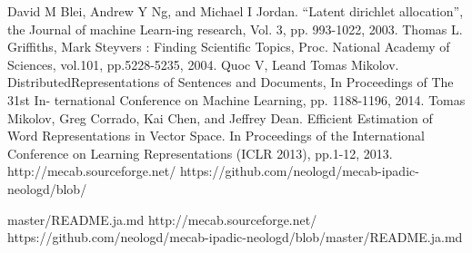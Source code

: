 \documentclass[a4paper,11pt,oneside,openany]{jsbook}
\begin{document}
\begin{thebibliography}{99}
	David M Blei, Andrew Y Ng, and Michael I Jordan. “Latent dirichlet allocation”, the Journal of machine Learn-ing research, Vol. 3, pp. 993-1022, 2003.
	Thomas L. Griffiths, Mark Steyvers : Finding Scientific Topics, Proc. National Academy of Sciences, vol.101, pp.5228-5235, 2004.	
	Quoc V, Leand Tomas Mikolov. DistributedRepresentations of Sentences and Documents, In Proceedings of The 31st In- ternational Conference on Machine Learning, pp. 1188-1196, 2014.	
	Tomas Mikolov, Greg Corrado, Kai Chen, and Jeffrey Dean. Efficient Estimation of Word Representations in Vector Space. In Proceedings of the International Conference on Learning Representations (ICLR 2013), pp.1-12, 2013.
	http://mecab.sourceforge.net/
	https://github.com/neologd/mecab-ipadic-neologd/blob/
	\par master/README.ja.md
	http://mecab.sourceforge.net/
	https://github.com/neologd/mecab-ipadic-neologd/blob/master/README.ja.md
	
	
\end{thebibliography}
\end{document}
